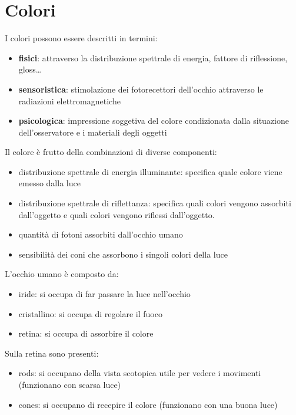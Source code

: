 \chapter{Colori}
I colori possono essere descritti in termini:
\begin{itemize}
    \item \textbf{fisici}: attraverso la distribuzione spettrale di energia, fattore 
    di riflessione, gloss\dots
    \item \textbf{sensoristica}: stimolazione dei fotorecettori dell'occhio attraverso
    le radiazioni elettromagnetiche
    \item \textbf{psicologica}: impressione soggetiva del colore condizionata 
    dalla situazione dell'osservatore e i materiali degli oggetti
\end{itemize}

Il colore è frutto della combinazioni di diverse componenti:
\begin{itemize}
    \item distribuzione spettrale di energia illuminante: specifica quale colore 
    viene emesso dalla luce
    \item distribuzione spettrale di riflettanza: specifica quali colori vengono 
    assorbiti dall'oggetto e quali colori vengono riflessi dall'oggetto.
    \item quantità di fotoni assorbiti dall'occhio umano
    \item sensibilità dei coni che assorbono i singoli colori della luce 
\end{itemize}

L'occhio umano è composto da:
\begin{itemize}
    \item iride: si occupa di far passare la luce nell'occhio
    \item cristallino: si occupa di regolare il fuoco
    \item retina: si occupa di assorbire il colore
\end{itemize}

Sulla retina sono presenti:
\begin{itemize}
    \item rods: si occupano della vista scotopica utile per vedere i movimenti (funzionano con scarsa luce)
    \item cones: si occupano di recepire il colore (funzionano con una buona luce)
\end{itemize}

